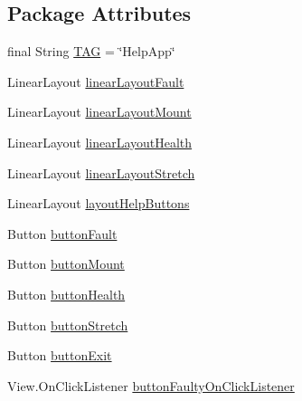 \subsection*{Package Attributes}
\begin{DoxyCompactItemize}
\item 
final String \mbox{\hyperlink{classcom_1_1example_1_1trainawearapplication_1_1_help_app_ad19d266425dcfdbe6449d8f781743d22}{T\+AG}} = \char`\"{}Help\+App\char`\"{}
\item 
Linear\+Layout \mbox{\hyperlink{classcom_1_1example_1_1trainawearapplication_1_1_help_app_a7bfd7bbcb027ebf76853a915f306ed8f}{linear\+Layout\+Fault}}
\item 
Linear\+Layout \mbox{\hyperlink{classcom_1_1example_1_1trainawearapplication_1_1_help_app_a2c5dcc6eea1a6820809159358e695732}{linear\+Layout\+Mount}}
\item 
Linear\+Layout \mbox{\hyperlink{classcom_1_1example_1_1trainawearapplication_1_1_help_app_a3a0384d121d039e7967fe4f10458b85c}{linear\+Layout\+Health}}
\item 
Linear\+Layout \mbox{\hyperlink{classcom_1_1example_1_1trainawearapplication_1_1_help_app_a28ea93e9921eb7a2c0641c261beddc00}{linear\+Layout\+Stretch}}
\item 
Linear\+Layout \mbox{\hyperlink{classcom_1_1example_1_1trainawearapplication_1_1_help_app_add39ef60d77ef6e5427a7e6dff1a2f7e}{layout\+Help\+Buttons}}
\item 
Button \mbox{\hyperlink{classcom_1_1example_1_1trainawearapplication_1_1_help_app_a10e8851e36765e5b5af68f6fd3f29edb}{button\+Fault}}
\item 
Button \mbox{\hyperlink{classcom_1_1example_1_1trainawearapplication_1_1_help_app_a19afeb1672bcf7cfd3218dd4c20a507a}{button\+Mount}}
\item 
Button \mbox{\hyperlink{classcom_1_1example_1_1trainawearapplication_1_1_help_app_aa8962ae96dd740e326dc4d2b1a182b09}{button\+Health}}
\item 
Button \mbox{\hyperlink{classcom_1_1example_1_1trainawearapplication_1_1_help_app_a651a6bf0927fb64e90181280d45d88c9}{button\+Stretch}}
\item 
Button \mbox{\hyperlink{classcom_1_1example_1_1trainawearapplication_1_1_help_app_a84fb9249fb28730b485a6bc71bc22867}{button\+Exit}}
\item 
View.\+On\+Click\+Listener \mbox{\hyperlink{classcom_1_1example_1_1trainawearapplication_1_1_help_app_af54e8eca744ea438ef2dabe8f7ddd085}{button\+Faulty\+On\+Click\+Listener}}
\item 

\end{DoxyCompactItemize}
